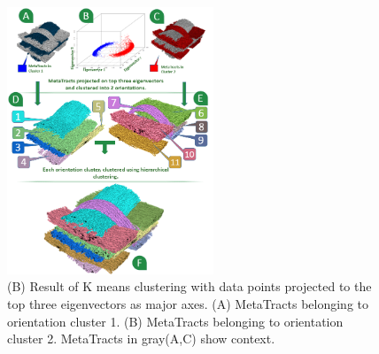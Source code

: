 \begin{figure}[tb]
  \centering  	
  \includegraphics[width=0.55\textwidth]{imagesMT2014/garb2}
  	\caption{(B) Result of K means clustering with data points projected to the top three eigenvectors as major axes. (A) MetaTracts belonging to orientation cluster 1. (B) MetaTracts belonging to orientation cluster 2. MetaTracts in gray(A,C) show context. }
  \label{fig:orientation_clustering}
  \end{figure}


